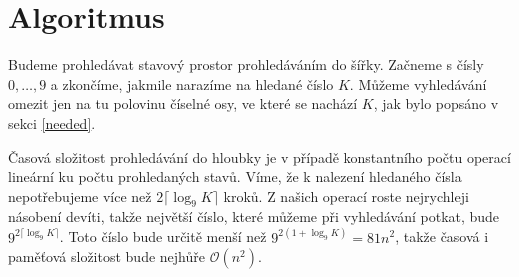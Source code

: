\documentclass{article}
\begin{document}
\section{Algoritmus}

Budeme prohledávat stavový prostor prohledáváním do šířky. Začneme s čísly $0, \dots, 9$ a zkončíme, jakmile narazíme na hledané číslo $K$. Můžeme vyhledávání omezit jen na tu polovinu číselné osy, ve které se nachází $K$, jak bylo popsáno v sekci \ref{needed}.

Časová složitost prohledávání do hloubky je v případě konstantního počtu operací lineární ku počtu prohledaných stavů. Víme, že k nalezení hledaného čísla nepotřebujeme více než $2\lceil\log_9 K\rceil$ kroků. Z našich operací roste nejrychleji násobení devíti, takže největší číslo, které můžeme při vyhledávání potkat, bude $9^{2\lceil\log_9 K\rceil}$. Toto číslo bude určitě menší než $9^{2 \left(1 + \log_9 K\right)} = 81 n^2$, takže časová i paměťová složitost bude nejhůře $\mathcal{O}\left(n^2\right)$.
\end{document}
